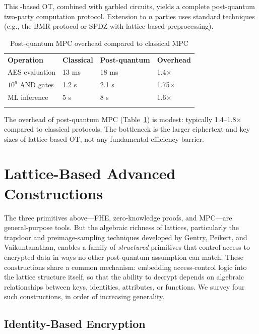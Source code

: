 This \lwe{}-based OT, combined with garbled circuits, yields a complete post-quantum two-party computation protocol.  Extension to $n$ parties uses standard techniques (e.g., the BMR protocol or SPDZ with lattice-based preprocessing).

\begin{table}[t]
\caption{Post-quantum MPC overhead compared to classical MPC}
\label{tab:pq-mpc}
\begin{tabular}{p{3.5cm}p{2.5cm}p{2.5cm}p{2cm}}
\hline\noalign{\smallskip}
\textbf{Operation} & \textbf{Classical} & \textbf{Post-quantum} & \textbf{Overhead} \\
\noalign{\smallskip}\svhline\noalign{\smallskip}
AES evaluation & 13 ms & 18 ms & 1.4$\times$ \\
$10^6$ AND gates & 1.2 s & 2.1 s & 1.75$\times$ \\
ML inference & 5 s & 8 s & 1.6$\times$ \\
\noalign{\smallskip}\hline
\end{tabular}
\end{table}

The overhead of post-quantum MPC (Table~\ref{tab:pq-mpc}) is modest: typically 1.4--1.8$\times$ compared to classical protocols.  The bottleneck is the larger ciphertext and key sizes of lattice-based OT, not any fundamental efficiency barrier.


\section{Lattice-Based Advanced Constructions}
\label{sec:lattice-advanced}

The three primitives above---FHE, zero-knowledge proofs, and MPC---are general-purpose tools.  But the algebraic richness of lattices, particularly the trapdoor and preimage-sampling techniques developed by Gentry, Peikert, and Vaikuntanathan, enables a family of \emph{structured} primitives that control access to encrypted data in ways no other post-quantum assumption can match.  These constructions share a common mechanism: embedding access-control logic into the lattice structure itself, so that the ability to decrypt depends on algebraic relationships between keys, identities, attributes, or functions.  We survey four such constructions, in order of increasing generality.


\subsection{Identity-Based Encryption}
\label{subsec:ibe}

